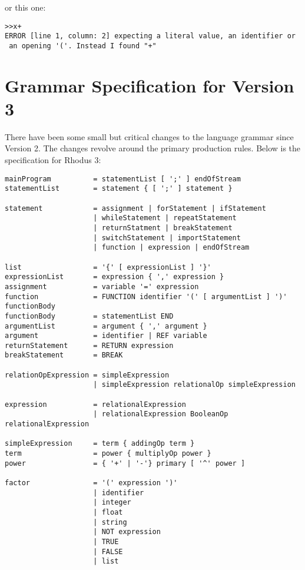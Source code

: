 or this one:

\begin{lstlisting}
>>x+
ERROR [line 1, column: 2] expecting a literal value, an identifier or
 an opening '('. Instead I found "+"
\end{lstlisting}

\section{Grammar Specification for Version 3}

There have been some small but critical changes to the language grammar since Version 2. The changes revolve around the primary production rules. Below is the specification for Rhodus 3:

\footnotesize\begin{verbatim}
mainProgram          = statementList [ ';' ] endOfStream
statementList        = statement { [ ';' ] statement }

statement            = assignment | forStatement | ifStatement
                     | whileStatement | repeatStatement
                     | returnStatment | breakStatement
                     | switchStatement | importStatement
                     | function | expression | endOfStream

list                 = '{' [ expressionList ] '}'
expressionList       = expression { ',' expression }
assignment           = variable '=' expression
function             = FUNCTION identifier '(' [ argumentList ] ')' functionBody
functionBody         = statementList END
argumentList         = argument { ',' argument }
argument             = identifier | REF variable
returnStatement      = RETURN expression
breakStatement       = BREAK

relationOpExpression = simpleExpression
                     | simpleExpression relationalOp simpleExpression

expression           = relationalExpression
                     | relationalExpression BooleanOp relationalExpression

simpleExpression     = term { addingOp term }
term                 = power { multiplyOp power }
power                = { '+' | '-'} primary [ '^' power ]

factor               = '(' expression ')'
                     | identifier
                     | integer
                     | float
                     | string
                     | NOT expression
                     | TRUE
                     | FALSE
                     | list


\end{verbatim}
